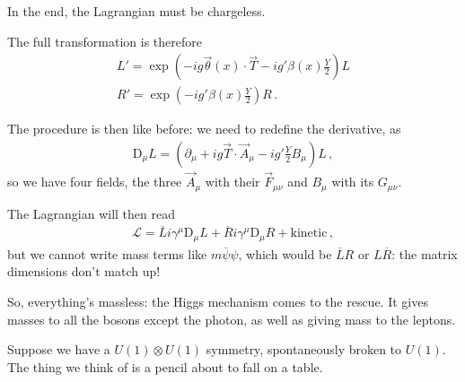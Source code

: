 \documentclass[main.tex]{subfiles}
\begin{document}
In the end, the Lagrangian must be chargeless. 

The full transformation is therefore 
%
\begin{align}
L' = \exp(-i g \vec{\theta}(x) \cdot \vec{T} - ig' \beta (x) \frac{Y}{2}) L \\
R' = \exp( - ig' \beta (x) \frac{Y}{2}) R
\,.
\end{align}

The procedure is then like before: we need to redefine the derivative, as 
%
\begin{align}
\text{D}_\mu L =\left(  \partial_{\mu } + i g \vec{T} \cdot \vec{A}_\mu - i g' \frac{Y}{2} B_\mu  \right) L
\,,
\end{align}
%
so we have four fields, the three \(\vec{A}_\mu \) with their \(\vec{F}_{\mu \nu }\) and \(B_\mu \) with its \(G_{\mu \nu }\). 

The Lagrangian will then read 
%
\begin{align}
\mathscr{L} = 
\overline{L} i \gamma^{\mu } \text{D}_\mu L 
+ 
\overline{R} i \gamma^{\mu } \text{D}_\mu R + \text{kinetic}
\,,
\end{align}
%
but we cannot write mass terms like \(m \overline{\psi} \psi \), which would be \(\overline{L} R\) or \(L \overline{R}\): the matrix dimensions don't match up! 

So, everything's massless: the Higgs mechanism comes to the rescue. 
It gives masses to all the bosons except the photon, as well as giving mass to the leptons. 

Suppose we have a \(U(1) \otimes U(1)\) symmetry, spontaneously broken to \(U(1)\). The thing we think of is a pencil about to fall on a table. 
\end{document}
